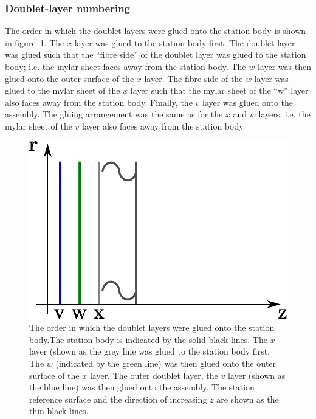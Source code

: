 \subsubsection{Doublet-layer numbering}
\label{SubSubSect:DblNmbrng}

The order in which the doublet layers were glued onto the station body is shown in figure~\ref{Fig:DblLyrOrder}. The $x$ layer was glued to the station body first. The doublet layer was glued such that the ``fibre side'' of the doublet layer was glued to the station body; i.e. the mylar sheet faces away from the station body. The $w$ layer was then glued onto the outer surface of the $x$ layer. The fibre side of the $w$ layer was glued to the mylar sheet of the $x$ layer such that the mylar sheet of the ``w'' layer also faces away from the station body. Finally, the $v$ layer was glued onto the assembly. The gluing arrangement was the same as for the $x$ and $w$ layers, i.e. the mylar sheet of the $v$ layer also faces away from the station body. 


\begin{figure}
  \begin{center}
    \includegraphics[width=0.65\linewidth]{detectors/tracker/02-Definitions/Figures/doublet-layer-order.pdf}
  \end{center}
  \caption{ The order in which the doublet layers were glued onto the station body.The station body is indicated by the solid black lines. The $x$ layer (shown as the grey line was glued to the station body first. The $w$ (indicated by the green line) was then glued onto the outer surface of the $x$ layer.  The outer doublet layer, the $v$ layer (shown as the blue line) was then glued onto the assembly. The station reference surface and the direction of increasing $z$  are shown as the thin black lines.}
  \label{Fig:DblLyrOrder}
\end{figure}

